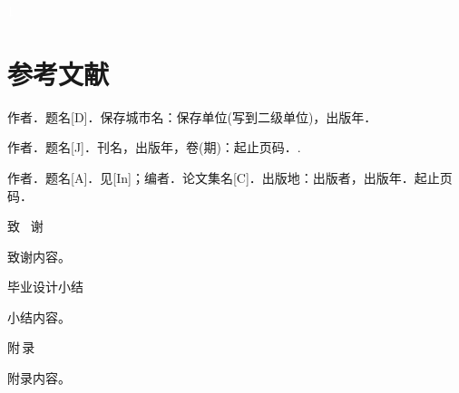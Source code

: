 \documentclass{nwputhesis}
\begin{document}
\newpage
\textcolor{white}{1}
\section*{参考文献}
\begingroup  %
\renewcommand{\section}[2]{} 
\begin{thebibliography}{99}

作者．题名[D]．保存城市名：保存单位(写到二级单位)，出版年．

作者．题名[J]．刊名，出版年，卷(期)：起止页码．.

作者．题名[A]．见[In]；编者．论文集名[C]．出版地：出版者，出版年．起止页码．

\end{thebibliography}

\section*{致谢}
\makespace %
\begin{center}
    { \blackti \fontsize{16.0600pt}{1.25}致 \, 谢}
\end{center}
致谢内容。

\section*{毕业设计小结}
\makespace
\begin{center}
    { \blackti \fontsize{16.0600pt}{1.25}毕业设计小结}
\end{center}
小结内容。

\newpage
\section*{附录}
\makespace
\begin{center}
    { \blackti \fontsize{16.0600pt}{1.25}附\,录}
\end{center}
附录内容。
\end{document}

